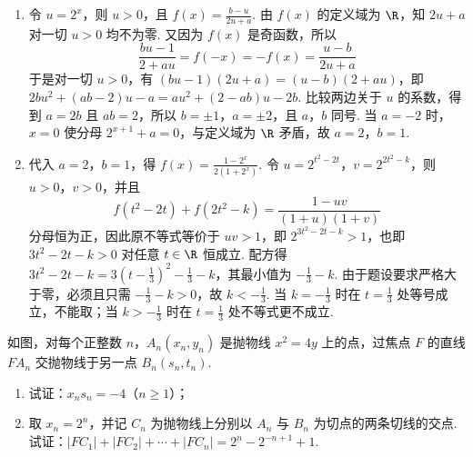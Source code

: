 \begin{solution}
\begin{enumerate}
\item 令 \(u=2^x\)，则 \(u>0\)，且 \(f(x)=\frac{b-u}{2u+a}\). 由 \(f(x)\) 的定义域为 \(\R\)，知 \(2u+a\) 对一切 \(u>0\) 均不为零. 又因为 \(f(x)\) 是奇函数，所以
\[
\frac{bu-1}{2+au}=f(-x)=-f(x)=\frac{u-b}{2u+a}
\]
于是对一切 \(u>0\)，有 \(\left(bu-1\right)\left(2u+a\right)=\left(u-b\right)\left(2+au\right)\)，即 \(2bu^{2}+(ab-2)u-a=au^{2}+(2-ab)u-2b\). 比较两边关于 \(u\) 的系数，得到 \(a=2b\) 且 \(ab=2\)，所以 \(b=\pm1\)，\(a=\pm2\)，且 \(a\)，\(b\) 同号. 当 \(a=-2\) 时，\(x=0\) 使分母 \(2^{x+1}+a=0\)，与定义域为 \(\R\) 矛盾，故 \(a=2\)，\(b=1\).
\item 代入 \(a=2\)，\(b=1\)，得 \(f(x)=\frac{1-2^x}{2(1+2^x)}\). 令 \(u=2^{t^2-2t}\)，\(v=2^{2t^2-k}\)，则 \(u>0\)，\(v>0\)，并且
\[
f(t^2-2t)+f(2t^2-k)=\frac{1-uv}{(1+u)(1+v)}
\]
分母恒为正，因此原不等式等价于 \(uv>1\)，即 \(2^{3t^2-2t-k}>1\)，也即 \(3t^2-2t-k>0\) 对任意 \(t\in\R\) 恒成立. 配方得 \(3t^2-2t-k=3\left(t-\frac{1}{3}\right)^2-\frac{1}{3}-k\)，其最小值为 \(-\frac{1}{3}-k\). 由于题设要求严格大于零，必须且只需 \(-\frac{1}{3}-k>0\)，故 \(k<-\frac{1}{3}\). 当 \(k=-\frac{1}{3}\) 时在 \(t=\frac{1}{3}\) 处等号成立，不能取；当 \(k>-\frac{1}{3}\) 时在 \(t=\frac{1}{3}\) 处不等式更不成立.
\end{enumerate}
\end{solution}

\begin{problem}
如图，对每个正整数 \(n\)，\(A_{n}(x_{n}, y_{n})\) 是抛物线 \(x^{2} = 4y\) 上的点，过焦点 \(F\) 的直线 \(FA_{n}\) 交抛物线于另一点 \(B_{n}(s_{n}, t_{n})\).

\begin{enumerate}
\item 试证：\(x_{n}s_{n} = -4\)（\(n \geqslant 1\)）；
\item 取 \(x_{n} = 2^{n}\)，并记 \(C_{n}\) 为抛物线上分别以 \(A_{n}\) 与 \(B_{n}\) 为切点的两条切线的交点. 试证：\(|FC_1| + |FC_2| + \cdots + |FC_n| = 2^n - 2^{-n+1} + 1\).
\end{enumerate}

\end{problem}

